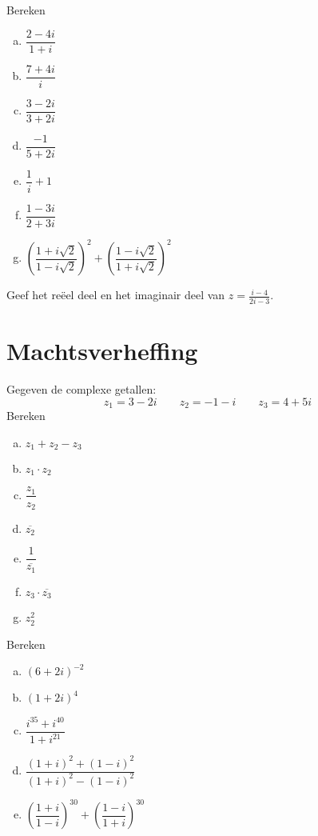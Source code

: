 \documentclass[12pt,twoside]{article}
\begin{document}
\begin{oefening}
  Bereken
  \begin{enumerate}[(a)]
    \itemsep1em
  \item $\displaystyle \dfrac{2-4i}{1+i}$
  \item $\displaystyle \dfrac{7+4i}{i}$
  \item $\displaystyle \dfrac{3-2i}{3+2i}$
  \item $\displaystyle \dfrac{-1}{5+2i}$
  \item $\displaystyle \dfrac{1}{i}+1$
  \item $\displaystyle \dfrac{1-3i}{2+3i}$
  \item $\displaystyle \left(\dfrac{1+i\sqrt{2}}{1-i\sqrt{2}}\right)^2+\left(\dfrac{1-i\sqrt{2}}{1+i\sqrt{2}}\right)^2$
  \end{enumerate}
\end{oefening}

\begin{oefening}
  Geef het reëel deel en het imaginair deel van $z=\frac{i-4}{2i-3}$.
\end{oefening}

\section{Machtsverheffing}

\begin{oefening}
  Gegeven de complexe getallen:
  $$z_1=3-2i \qquad z_2=-1-i \qquad z_3=4+5i$$
  Bereken
  \begin{multicols}{2}
    \begin{enumerate}[(a)]
      \itemsep 1em
    \item $\displaystyle z_1+z_2-z_3$
    \item $\displaystyle z_1\cdot z_2$
    \item $\displaystyle \dfrac{z_1}{z_2}$
    \item $\displaystyle \overline{z_2}$
    \item $\displaystyle \dfrac{1}{\overline{z_1}}$
    \item $\displaystyle z_3\cdot \overline{z_3}$
    \item $\displaystyle z_2^2$
    \end{enumerate}
  \end{multicols}
\end{oefening}

\begin{oefening}
  Bereken
  \begin{enumerate}[(a)]
    \itemsep1em
  \item $\displaystyle \left(6+2i\right)^{-2}$
  \item $\displaystyle \left(1+2i\right)^4$
  \item $\displaystyle \dfrac{i^{35}+i^{40}}{1+i^{21}}$
  \item $\displaystyle \dfrac{(1+i)^2+(1-i)^2}{(1+i)^2-(1-i)^2}$
  \item $\displaystyle \left(\dfrac{1+i}{1-i}\right)^{30}+\left(\dfrac{1-i}{1+i}\right)^{30}$
  \end{enumerate}
\end{oefening}
\end{document}
